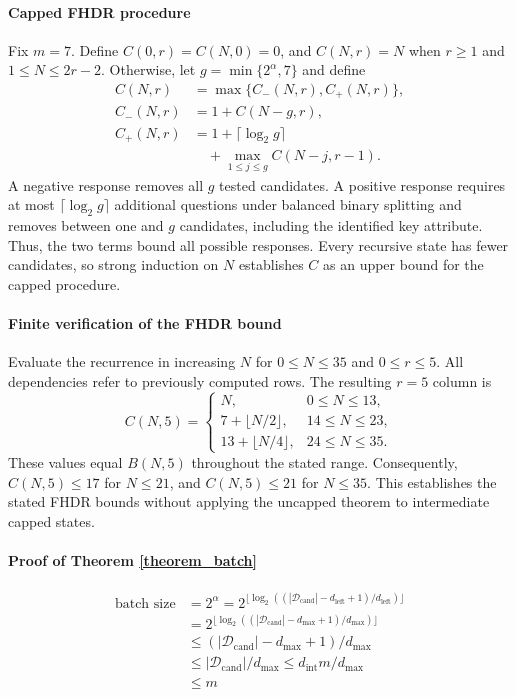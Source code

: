 \paragraph{Capped FHDR procedure} Fix $m=7$. Define $C(0,r)=C(N,0)=0$, and $C(N,r)=N$ when $r\geq1$ and $1\leq N\leq2r-2$. Otherwise, let $g=\min\{2^\alpha,7\}$ and define
\[
\begin{aligned}
C(N,r)&=\max\{C_-(N,r),C_+(N,r)\},\\
C_-(N,r)&=1+C(N-g,r),\\
C_+(N,r)&=1+\lceil\log_2g\rceil\\
&\quad+\max_{1\leq j\leq g}C(N-j,r-1).
\end{aligned}
\]
A negative response removes all $g$ tested candidates. A positive response requires at most $\lceil\log_2g\rceil$ additional questions under balanced binary splitting and removes between one and $g$ candidates, including the identified key attribute. Thus, the two terms bound all possible responses. Every recursive state has fewer candidates, so strong induction on $N$ establishes $C$ as an upper bound for the capped procedure.

\paragraph{Finite verification of the FHDR bound} Evaluate the recurrence in increasing $N$ for $0\leq N\leq35$ and $0\leq r\leq5$. All dependencies refer to previously computed rows. The resulting $r=5$ column is
\[
C(N,5)=
\begin{cases}
N,&0\leq N\leq13,\\
7+\lfloor N/2\rfloor,&14\leq N\leq23,\\
13+\lfloor N/4\rfloor,&24\leq N\leq35.
\end{cases}
\]
These values equal $B(N,5)$ throughout the stated range. Consequently, $C(N,5)\leq17$ for $N\leq21$, and $C(N,5)\leq21$ for $N\leq35$. This establishes the stated FHDR bounds without applying the uncapped theorem to intermediate capped states.

\paragraph{Proof of Theorem \ref{theorem_batch}}

\begin{equation*}
\begin{aligned}
    \text{batch size}
    &= 2^\alpha = 2^{\lfloor\log_2 ((|\mathcal{D}_\text{cand}|- d_\text{left}+1)/d_\text{left})\rfloor} \\
    &= 2^{\lfloor\log_2 ((|\mathcal{D}_\text{cand}|-d_\text{max}+1)/d_\text{max})\rfloor}\\
    &\leq (|\mathcal{D}_\text{cand}|-d_\text{max}+1)/d_\text{max}\\
    &\leq |\mathcal{D}_\text{cand}|/d_\text{max} \leq d_\text{int}m/d_\text{max}\\
    &\leq m
\end{aligned}
\end{equation*}

